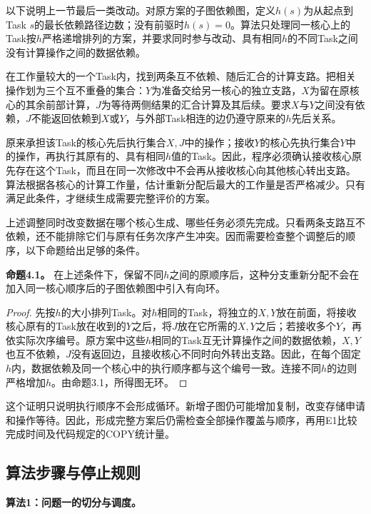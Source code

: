 \documentclass[anonymous,notoc]{gmcm2026}
\begin{document}
以下说明上一节最后一类改动。对原方案的子图依赖图，定义\(h(s)\)为从起点到Task \(s\)的最长依赖路径边数；没有前驱时\(h(s)=0\)。算法只处理同一核心上的Task按\(h\)严格递增排列的方案，并要求同时参与改动、具有相同\(h\)的不同Task之间没有计算操作之间的数据依赖。

在工作量较大的一个Task内，找到两条互不依赖、随后汇合的计算支路。把相关操作划为三个互不重叠的集合：\(Y\)为准备交给另一核心的独立支路，\(X\)为留在原核心的其余前部计算，\(J\)为等待两侧结果的汇合计算及其后续。要求\(X\)与\(Y\)之间没有依赖，\(J\)不能返回依赖到\(X\)或\(Y\)，与外部Task相连的边仍遵守原来的\(h\)先后关系。

原来承担该Task的核心先后执行集合\(X,J\)中的操作；接收\(Y\)的核心先执行集合\(Y\)中的操作，再执行其原有的、具有相同\(h\)值的Task。因此，程序必须确认接收核心原先存在这个Task，而且在同一次修改中不会再从接收核心向其他核心转出支路。算法根据各核心的计算工作量，估计重新分配后最大的工作量是否严格减少。只有满足此条件，才继续生成需要完整评价的方案。

上述调整同时改变数据在哪个核心生成、哪些任务必须先完成。只看两条支路互不依赖，还不能排除它们与原有任务次序产生冲突。因而需要检查整个调整后的顺序，以下命题给出足够的条件。

\textbf{命题4.1。} 在上述条件下，保留不同\(h\)之间的原顺序后，这种分支重新分配不会在加入同一核心顺序后的子图依赖图中引入有向环。

\begin{proof} 先按\(h\)的大小排列Task。对\(h\)相同的Task，将独立的\(X,Y\)放在前面，将接收核心原有的Task放在收到的\(Y\)之后，将\(J\)放在它所需的\(X,Y\)之后；若接收多个\(Y\)，再依实际次序编号。原方案中这些\(h\)相同的Task互无计算操作之间的数据依赖，\(X,Y\)也互不依赖，\(J\)没有返回边，且接收核心不同时向外转出支路。因此，在每个固定\(h\)内，数据依赖及同一个核心中的执行顺序都与这个编号一致。连接不同\(h\)的边则严格增加\(h\)。由命题3.1，所得图无环。\end{proof}

这个证明只说明执行顺序不会形成循环。新增子图仍可能增加复制，改变存储申请和操作等待。因此，形成完整方案后仍需检查全部操作覆盖与顺序，再用E1比较完成时间及代码规定的COPY统计量。

\subsection{算法步骤与停止规则}

\textbf{算法1：问题一的切分与调度。}
\end{document}
